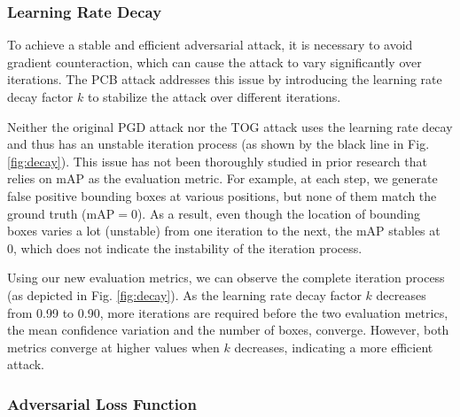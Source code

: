 
\subsubsection{Learning Rate Decay}

To achieve a stable and efficient adversarial attack, it is necessary to avoid gradient counteraction, which can cause the attack to vary significantly over iterations. The PCB attack addresses this issue by introducing the learning rate decay factor $k$ to stabilize the attack over different iterations.

Neither the original PGD attack nor the TOG attack uses the learning rate decay and thus has an unstable iteration process (as shown by the black line in Fig. \ref{fig:decay}). This issue has not been thoroughly studied in prior research that relies on mAP as the evaluation metric. For example, at each step, we generate false positive bounding boxes at various positions, but none of them match the ground truth (mAP$=0$). As a result, even though the location of bounding boxes varies a lot (unstable) from one iteration to the next, the mAP stables at 0, which does not indicate the instability of the iteration process.

Using our new evaluation metrics, we can observe the complete iteration process (as depicted in Fig. \ref{fig:decay}). As the learning rate decay factor $k$ decreases from 0.99 to 0.90, more iterations are required before the two evaluation metrics, the mean confidence variation and the number of boxes, converge. However, both metrics converge at higher values when $k$ decreases, indicating a more efficient attack. 



\subsubsection{Adversarial Loss Function}

